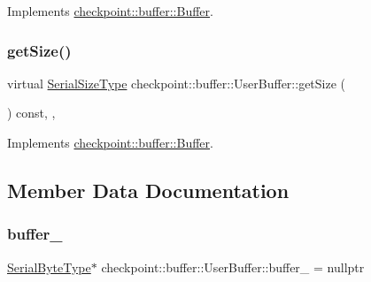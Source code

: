 Implements \hyperlink{structcheckpoint_1_1buffer_1_1_buffer_ad6a6457df5d7020cd3622d353eb8394b}{checkpoint\+::buffer\+::\+Buffer}.

\mbox{\label{structcheckpoint_1_1buffer_1_1_user_buffer_a434e7feda041957509ee08791d3f4949}} 
\subsubsection{\texorpdfstring{get\+Size()}{getSize()}}
{\footnotesize\ttfamily virtual \hyperlink{namespacecheckpoint_a083f6674da3f94c2901b18c6d238217c}{Serial\+Size\+Type} checkpoint\+::buffer\+::\+User\+Buffer\+::get\+Size (\begin{DoxyParamCaption}{ }\end{DoxyParamCaption}) const\hspace{0.3cm}{\ttfamily [inline]}, {\ttfamily [override]}, {\ttfamily [virtual]}}



Implements \hyperlink{structcheckpoint_1_1buffer_1_1_buffer_a4d78cd3d4ab338bab7911fac4fe9434d}{checkpoint\+::buffer\+::\+Buffer}.



\subsection{Member Data Documentation}
\mbox{\label{structcheckpoint_1_1buffer_1_1_user_buffer_a7fb5fb2686430c6a73572e835343c516}} 
\subsubsection{\texorpdfstring{buffer\+\_\+}{buffer\_}}
{\footnotesize\ttfamily \hyperlink{namespacecheckpoint_ae57f01cdc0b81776c23b6c7c934c58f5}{Serial\+Byte\+Type}$\ast$ checkpoint\+::buffer\+::\+User\+Buffer\+::buffer\+\_\+ = nullptr\hspace{0.3cm}{\ttfamily [private]}}


